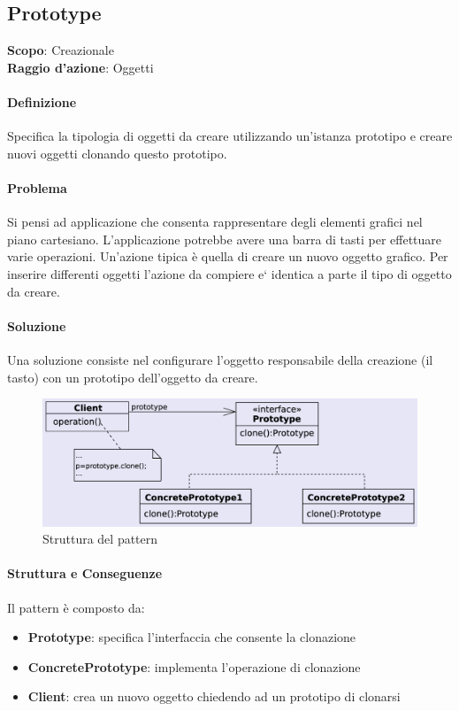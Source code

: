 \subsection{Prototype}
\label{prototype}

\textbf{Scopo}: Creazionale \\
\textbf{Raggio d'azione}: Oggetti

\paragraph{Definizione} Specifica la tipologia di oggetti da creare utilizzando un'istanza prototipo e creare nuovi oggetti clonando questo prototipo.

\paragraph{Problema} Si pensi ad applicazione che consenta rappresentare degli elementi grafici nel piano cartesiano. L’applicazione potrebbe avere una barra di tasti per effettuare varie operazioni. Un’azione tipica è quella di creare un nuovo oggetto grafico. Per inserire differenti oggetti l’azione da compiere e` identica a parte il tipo di oggetto da creare.

\paragraph{Soluzione} Una soluzione consiste nel configurare l’oggetto responsabile della creazione (il tasto) con un prototipo dell’oggetto da creare.

\begin{figure}[H]
    \centering
    \includegraphics[width=0.75\linewidth]{assets/pattern/prototype/prototype-struttura.png}
    \caption{Struttura del pattern}
\end{figure}

\paragraph{Struttura e Conseguenze} Il pattern è composto da:
\begin{itemize}
    \item \textbf{Prototype}: specifica l'interfaccia che consente la clonazione
    \item \textbf{ConcretePrototype}: implementa l'operazione di clonazione
    \item \textbf{Client}: crea un nuovo oggetto chiedendo ad un prototipo di clonarsi
\end{itemize}

